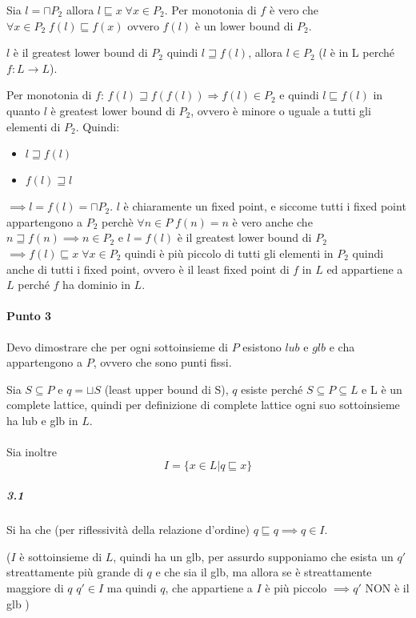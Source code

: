 \documentclass{article}
\newcommand{\pd}{P_{2}}
\begin{document}

Sia $l = \sqcap \pd $ allora $l \sqsubseteq x \; \forall x \in \pd$. Per monotonia di $f$ è vero che $\forall x \in \pd \; f(l) \sqsubseteq f(x)$ ovvero $f(l)$ è un lower bound di $\pd$.

$l$ è il greatest lower bound di $\pd$ quindi $l \sqsupseteq f(l) $, allora $l \in \pd$ ($l$ è in L perché $f:L\to L$).

Per monotonia di $f$: $f(l) \sqsupseteq f(f(l)) \Rightarrow f(l) \in \pd$ e quindi $l\sqsubseteq f(l)$ in quanto $l$ è greatest lower bound di $\pd$, ovvero è minore o uguale a tutti gli elementi di $\pd$. Quindi:
\begin{itemize}
    \item $l\sqsupseteq f(l)$
    \item $f(l) \sqsupseteq l$
\end{itemize}
$\implies l = f(l) = \sqcap \pd $. $ l $ è chiaramente un fixed point, e siccome tutti i fixed point appartengono a $ \pd $ perchè $ \forall n \in P \; f(n) = n $ è vero anche che $ n \sqsupseteq f(n) \implies n \in P_{2} $ e $l=f(l)$ è il greatest lower bound di $\pd$ $\implies f(l) \sqsubseteq x \; \forall x \in \pd $ quindi è più piccolo di tutti gli elementi in $\pd$ quindi anche di tutti i fixed point, ovvero è il least fixed point di $f$ in $L$ ed appartiene a $L$ perché $f$ ha dominio in $L$.

\paragraph{Punto 3}
Devo dimostrare che per ogni sottoinsieme di $P$ esistono $lub$ e $glb$ e cha appartengono a $P$, ovvero che sono punti fissi.

Sia $ S \subseteq P$ e $ q = \sqcup S$ (least upper bound di S), $q$ esiste perché $S \subseteq P \subseteq L$ e L è un complete lattice, quindi per definizione di complete lattice ogni suo sottoinsieme ha lub e glb in $L$.\\\\
Sia inoltre $$I=\{x \in L | q \sqsubseteq x\}$$

\subparagraph{3.1}Si ha che (per riflessività della relazione d'ordine) $q \sqsubseteq q \implies q \in I$.

($I$ è sottoinsieme di $L$, quindi ha un glb, per assurdo supponiamo che esista un $q'$ streattamente più grande di $q$ e che sia il glb, ma allora se è streattamente maggiore di $q$ $q'\in I$ ma quindi $q$, che appartiene a $I$ è più piccolo $\implies q'$ NON è il glb  )
\end{document}
